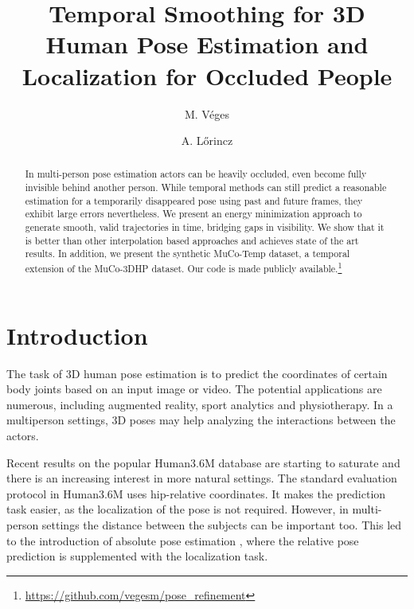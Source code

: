 \documentclass[runningheads, envcountsame, a4paper]{llncs}
\begin{document}
\title{Temporal Smoothing for 3D Human Pose Estimation and Localization for Occluded People}
\author{M. V\'eges \and A. L\H{o}rincz}


\maketitle              \setcounter{footnote}{0}
\begin{abstract}
In multi-person pose estimation actors can be heavily occluded, even become fully invisible behind another person. While temporal methods can still predict a reasonable estimation for a temporarily disappeared pose using past and future frames, they exhibit large errors nevertheless. We present an energy minimization approach to generate smooth, valid trajectories in time, bridging gaps in visibility. We show that it is better than other interpolation based approaches and achieves state of the art results. In addition, we present the synthetic MuCo-Temp dataset, a temporal extension of the MuCo-3DHP dataset. Our code is made publicly available.\footnote{\url{https://github.com/vegesm/pose_refinement}}

\end{abstract}


\section{Introduction}
The task of 3D human pose estimation is to predict the coordinates of certain body joints based on an input image or video. The potential applications are numerous, including augmented reality, sport analytics and physiotherapy. In a multiperson settings, 3D poses may help analyzing the interactions between the actors.

Recent results on the popular Human3.6M database \cite{h36m} are starting to saturate \cite{kocabas2019epipolar,integralPose} and there is an increasing interest in more natural settings. The standard evaluation protocol in Human3.6M uses hip-relative coordinates. It makes the prediction task easier, as the localization of the pose is not required. However, in multi-person settings the distance between the subjects can be important too. This led to the introduction of absolute pose estimation \cite{moon2019camdistance,veges2019depthpose}, where the relative pose prediction is supplemented with the localization task.
\end{document}
